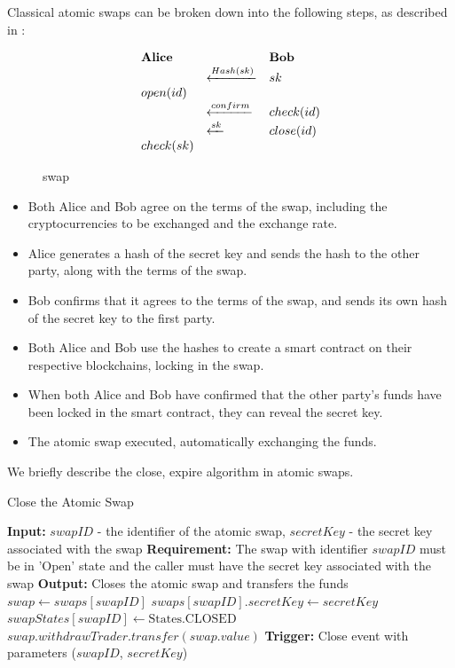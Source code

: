 \documentclass[twocolumn]{article}
\begin{document}
Classical atomic swaps can be broken down into the following steps, as described in \cite{eth-atomic-swap}:

\begin{figure}
\[
\begin{array}{l l l}
  \text{\textbf{Alice}} & & \text{\textbf{Bob}} \\
    &\xleftarrow{Hash(sk)} & sk  \\
  open(id) & & \\
                        & \xleftarrow{confirm} & check(id) \\
                        & \xleftarrow{sk} & close(id) \\
  check(sk) & & \\
\end{array}
\]
\label{swap}
\caption{swap}
\end{figure}


\begin{itemize}[itemsep=2pt,topsep=0pt,parsep=0pt]

 \item   Both Alice and Bob agree on the terms of the swap, including the cryptocurrencies to be exchanged and the exchange rate.
\item    Alice generates a hash of the secret key and sends the hash to the other party, along with the terms of the swap.
\item     Bob confirms that it agrees to the terms of the swap, and sends its own hash of the secret key to the first party.
\item    Both Alice and Bob use the hashes to create a smart contract on their respective blockchains, locking in the swap.
\item    When both Alice and Bob have confirmed that the other party's funds have been locked in the smart contract, they can reveal the secret key.
\item    The atomic swap executed, automatically exchanging the funds.
\end{itemize}
We briefly describe the close, expire algorithm in atomic swaps.

\begin{algorithm}[htbp]
\caption{Close the Atomic Swap}
\begin{algorithmic}[1]
\State \textbf{Input:} $swapID$ - the identifier of the atomic swap, $secretKey$ - the secret key associated with the swap
\State \textbf{Requirement:} The swap with identifier $swapID$ must be in 'Open' state and the caller must have the secret key associated with the swap
\State \textbf{Output:} Closes the atomic swap and transfers the funds
\State $swap \gets swaps[swapID]$
\State $swaps[swapID].secretKey \gets secretKey$
\State $swapStates[swapID] \gets \text{States.CLOSED}$
\State $swap.withdrawTrader.transfer(swap.value)$
\State \textbf{Trigger:} Close event with parameters ($swapID$, $secretKey$)
\EndFunction
\end{algorithmic}
\end{algorithm}
\end{document}
